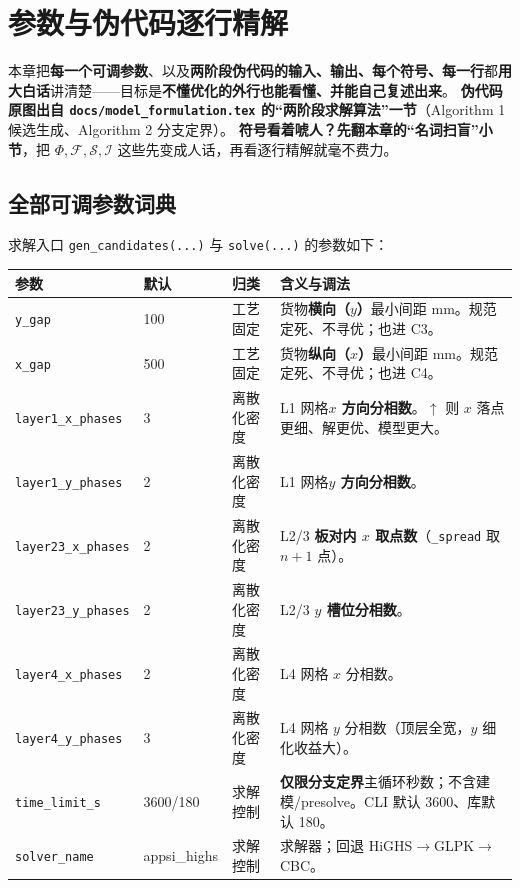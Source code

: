 \documentclass[11pt]{ctexart}
\newcommand{\code}[1]{\texttt{#1}}
\begin{document}
\section{参数与伪代码逐行精解}
本章把\textbf{每一个可调参数}、以及\textbf{两阶段伪代码的输入、输出、每个符号、每一行}都\textbf{用大白话}讲清楚——目标是\textbf{不懂优化的外行也能看懂、并能自己复述出来}。
\textbf{伪代码原图出自 \code{docs/model\_formulation.tex} 的“两阶段求解算法”一节}（Algorithm 1 候选生成、Algorithm 2 分支定界）。
\textbf{符号看着唬人？先翻本章的“名词扫盲”小节}，把 $\Phi,\mathcal{F},\mathcal{S},\mathcal{I}$ 这些先变成人话，再看逐行精解就毫不费力。

\subsection{全部可调参数词典}
求解入口 \code{gen\_candidates(...)} 与 \code{solve(...)} 的参数如下：
\begin{center}\small
\begin{longtable}{@{}lll p{6cm}@{}}
\toprule
参数 & 默认 & 归类 & 含义与调法 \\
\midrule\endhead
\code{y\_gap} & 100 & 工艺固定 & 货物\textbf{横向（$y$）}最小间距 mm。规范定死、不寻优；也进 C3。 \\
\code{x\_gap} & 500 & 工艺固定 & 货物\textbf{纵向（$x$）}最小间距 mm。规范定死、不寻优；也进 C4。 \\
\code{layer1\_x\_phases} & 3 & 离散化密度 & L1 网格\textbf{$x$ 方向分相数}。$\uparrow$ 则 $x$ 落点更细、解更优、模型更大。 \\
\code{layer1\_y\_phases} & 2 & 离散化密度 & L1 网格\textbf{$y$ 方向分相数}。 \\
\code{layer23\_x\_phases} & 2 & 离散化密度 & L2/3 \textbf{板对内 $x$ 取点数}（\code{\_spread} 取 $n{+}1$ 点）。 \\
\code{layer23\_y\_phases} & 2 & 离散化密度 & L2/3 \textbf{$y$ 槽位分相数}。 \\
\code{layer4\_x\_phases} & 2 & 离散化密度 & L4 网格 $x$ 分相数。 \\
\code{layer4\_y\_phases} & 3 & 离散化密度 & L4 网格 $y$ 分相数（顶层全宽，$y$ 细化收益大）。 \\
\code{time\_limit\_s} & 3600/180 & 求解控制 & \textbf{仅限分支定界}主循环秒数；不含建模/presolve。CLI 默认 3600、库默认 180。 \\
\code{solver\_name} & appsi\_highs & 求解控制 & 求解器；回退 HiGHS$\to$GLPK$\to$CBC。 \\
\bottomrule
\end{longtable}
\end{center}
\end{document}
